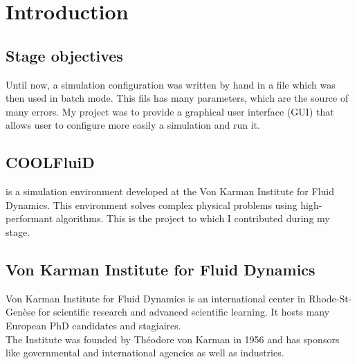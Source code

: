 \chapter{Introduction}

\section{Stage objectives}

Until now, a simulation configuration was written by hand in a file which was
then used in batch mode. This fils has many parameters, which are the source of
many errors. My project was to provide a graphical user interface (GUI) that
allows user to configure more easily a simulation and run
it. 

\section{COOLFluiD}

\inQuotes{\textit{\cf}} is a simulation environment developed at the Von Karman
Institute for Fluid Dynamics. This environment solves complex physical problems
using high-performant algorithms. This is the project to which I contributed
during my stage.\\

\section{Von Karman Institute for Fluid Dynamics}

Von Karman Institute for Fluid Dynamics is an international center in
Rhode-St-Gen\`{e}se for scientific research and advanced scientific learning. It
hosts many European PhD candidates and stagiaires.\\

The Institute was founded by Th\'{e}odore von Karman in 1956 and has sponsors
like governmental and international agencies as well as industries.
\\

